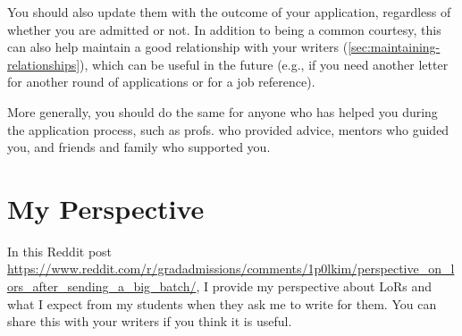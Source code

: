 \documentclass[oneside,11pt]{book}
\newenvironment{commentbox}[1][]{
  \small
  \begin{marker}[\faChessPawn{}]
    {\textbf{#1}}
  }{
  \end{marker}
}
\begin{document}
You should also update them with the outcome of your application, regardless of whether you are admitted or not.  In addition to being a common courtesy, this can also help maintain a good relationship with your writers (\autoref{sec:maintaining-relationships}), which can be useful in the future (e.g., if you need another letter for another round of applications or for a job reference).

More generally, you should do the same for anyone who has helped you during the application process, such as profs. who provided advice, mentors who guided you, and friends and family who supported you. 


\section{My Perspective}\label{sec:my-lor-perspective}
\begin{commentbox}
In this Reddit post \url{https://www.reddit.com/r/gradadmissions/comments/1p0lkim/perspective_on_lors_after_sending_a_big_batch/}, I provide my perspective about LoRs and what I expect from my students when they ask me to write for them.  You can share this with your writers if you think it is useful. 
\end{commentbox}
\end{document}

